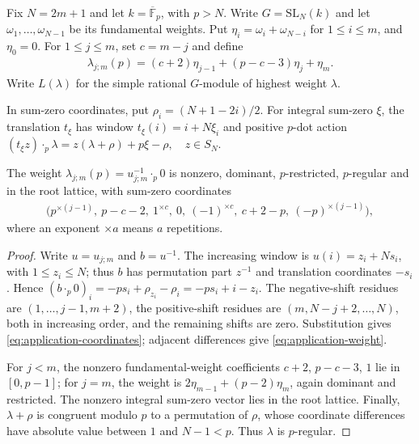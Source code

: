 \documentclass[a4paper,11pt]{amsart}
\numberwithin{equation}{subsection}
\theoremstyle{plain}
\theoremstyle{definition}
\theoremstyle{remark}
\begin{document}
Fix $N=2m+1$ and let $k=\overline{\mathbb F}_p$, with $p>N$.
Write $G=\mathrm{SL}_N(k)$ and let
$\omega_1,\ldots,\omega_{N-1}$ be its fundamental weights. Put
$\eta_i=\omega_i+\omega_{N-i}$ for $1\le i\le m$, and $\eta_0=0$.
For $1\le j\le m$, set $c=m-j$ and define
\begin{gather}\label{eq:application-weight}
\lambda_{j;m}(p)
=(c+2)\eta_{j-1}+(p-c-3)\eta_j+\eta_m.
\end{gather}
Write $L(\lambda)$ for the simple rational $G$-module of
highest weight $\lambda$.

In sum-zero coordinates, put $\rho_i=(N+1-2i)/2$.
For integral sum-zero $\xi$, the translation $t_\xi$ has
window $t_\xi(i)=i+N\xi_i$ and positive $p$-dot action
$(t_\xi z)\mathbin{\cdot_p}\lambda
=z(\lambda+\rho)+p\xi-\rho,\quad z\in S_N$.

\begin{lemma}\label{lem:application-weight}
The weight $\lambda_{j;m}(p)=u_{j;m}^{-1}\cdot_p0$ is nonzero,
dominant, $p$-restricted, $p$-regular and in the root lattice,
with sum-zero coordinates
\begin{gather}\label{eq:application-coordinates}
\bigl(p^{\times(j-1)},\ p-c-2,\ 1^{\times c},\ 0,\
(-1)^{\times c},\ c+2-p,\ (-p)^{\times(j-1)}\bigr),
\end{gather}
where an exponent $\times a$ means $a$ repetitions.
\end{lemma}

\begin{proof}
Write $u=u_{j;m}$ and $b=u^{-1}$. The increasing window is
$u(i)=z_i+Ns_i$, with $1\le z_i\le N$; thus $b$ has permutation
part $z^{-1}$ and translation coordinates $-s_i$. Hence
$(b\cdot_p0)_i=-ps_i+\rho_{z_i}-\rho_i=-ps_i+i-z_i$.
The negative-shift residues are $(1,\ldots,j-1,m+2)$, the
positive-shift residues are $(m,N-j+2,\ldots,N)$, both in increasing
order, and the remaining shifts are zero. Substitution gives
\autoref{eq:application-coordinates}; adjacent differences give
\autoref{eq:application-weight}.

For $j<m$, the nonzero fundamental-weight coefficients
$c+2$, $p-c-3$, $1$ lie in $[0,p-1]$; for $j=m$, the weight is
$2\eta_{m-1}+(p-2)\eta_m$, again dominant and restricted.
The nonzero integral sum-zero vector lies in the root lattice.
Finally, $\lambda+\rho$ is congruent modulo $p$ to a permutation
of $\rho$, whose coordinate differences have absolute value
between $1$ and $N-1<p$. Thus $\lambda$ is $p$-regular.
\end{proof}
\end{document}
